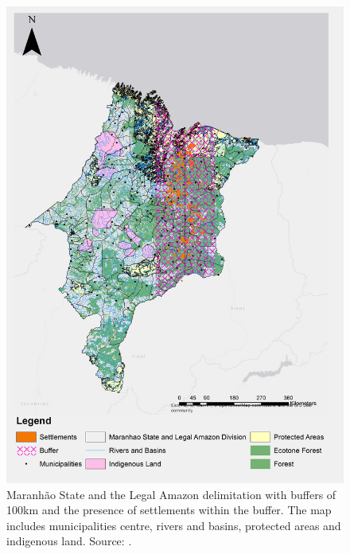 \begin{figure}[H]
  \centering
  \includegraphics[width=1\textwidth]{Chapter2/MaranhaoChapter2_Fig3.png}
\caption[Maranhão state and Settlements]{Maranhão State and the Legal Amazon delimitation with buffers of 100km and the presence of settlements within the buffer. The map includes municipalities centre, rivers and basins, protected areas and indigenous land. Source: \citep{MMMAwebsite,nugeo_2018,embrapa_2018, INCRA}.}
\label{fig:delimitacaosett2}
\end{figure}




